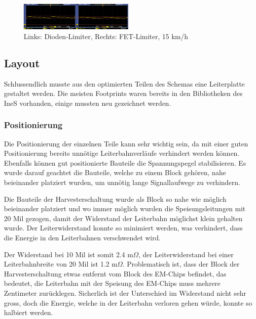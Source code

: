 \begin{figure}[ht]
    \includegraphics[width=0.5\textwidth]{3Vorgehen/imag/Messung_Optimierung_Limiter.png}
    \caption{Links: Dioden-Limiter, Rechts: FET-Limiter, 15 km/h}\label{messung_optimierung_limiter} 
\end{figure}

\subsection{Layout}

Schlussendlich musste aus den optimierten Teilen des Schemas eine Leiterplatte gestaltet werden. Die meisten Footprints waren bereits in den Bibliotheken des IneS vorhanden, einige mussten neu gezeichnet werden.

\subsubsection{Positionierung}

Die Positionierung der einzelnen Teile kann sehr wichtig sein, da mit einer guten Positionierung bereits unnötige Leiterbahnverläufe verhindert werden können. Ebenfalls können gut positionierte Bauteile die Spannungspegel stabilisieren. Es wurde darauf geachtet die Bauteile, welche zu einem Block gehören, nahe beieinander platziert wurden, um unnötig lange Signallaufwege zu verhindern.

Die Bauteile der Harvesterschaltung wurde als Block so nahe wie möglich beieinander platziert und wo immer möglich wurden die Speisungsleitungen mit 20 Mil gezogen, damit der Widerstand der Leiterbahn möglichst klein gehalten wurde. Der Leiterwiderstand konnte so minimiert werden, was verhindert, dass die Energie in den Leiterbahnen verschwendet wird.


Der Widerstand bei 10 Mil ist somit 2.4 m$\Omega$, 
der Leiterwiderstand bei einer Leiterbahnbreite von 20 Mil ist 1.2 m$\Omega$. 
Problematisch ist, dass der Block der Harvesterschaltung etwas entfernt vom Block des EM-Chips befindet, das bedeutet, die Leiterbahn mit der Speisung des EM-Chips muss mehrere Zentimeter zurücklegen. Sicherlich ist der Unterschied im Widerstand nicht sehr gross, doch die Energie, welche in der Leiterbahn verloren gehen würde, konnte so halbiert werden.

